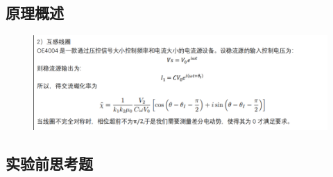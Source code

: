 \documentclass{ctexart}
\theoremstyle{ansstyle}
\begin{document}
\subsection{原理概述}
\begin{figure}[H]
    \centering
    \includegraphics[width=1.0\linewidth]{./png/z2.png}
\end{figure}
\subsection{实验前思考题}
\end{document}
